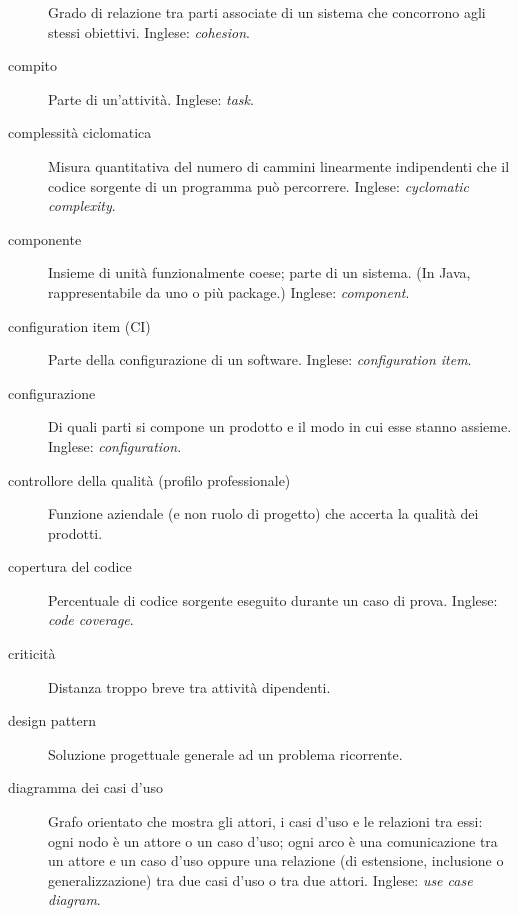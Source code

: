 \documentclass[a4paper]{article}
\begin{document}
\begin{description}
			Grado di relazione tra parti associate di un sistema che concorrono agli stessi obiettivi. Inglese: \emph{cohesion}.
			
	\item[compito] 

			Parte di un'attività. Inglese: \emph{task}.
			
	\item[complessità ciclomatica] 

			Misura quantitativa del numero di cammini linearmente indipendenti che il codice sorgente di un programma può percorrere. Inglese: \emph{cyclomatic complexity}.
			
	\item[componente] 

			Insieme di unità funzionalmente coese; parte di un sistema. (In Java, rappresentabile da uno o più package.) Inglese: \emph{component}.
			
	\item[configuration item (CI)] 

			Parte della configurazione di un software. Inglese: \emph{configuration item}.
			
	\item[configurazione] 

			Di quali parti si compone un prodotto e il modo in cui esse stanno assieme. Inglese: \emph{configuration}.
			
	\item[controllore della qualità (profilo professionale)] 

			Funzione aziendale (e non ruolo di progetto) che accerta la qualità dei prodotti.
			
	\item[copertura del codice] 

			Percentuale di codice sorgente eseguito durante un caso di prova. Inglese: \emph{code coverage}.
			
	\item[criticità] 

			Distanza troppo breve tra attività dipendenti.
			
	\item[design pattern] 

			Soluzione progettuale generale ad un problema ricorrente.
			
	\item[diagramma dei casi d'uso] 

			Grafo orientato che mostra gli attori, i casi d'uso e le relazioni tra essi: ogni nodo è un attore o un caso d'uso; ogni arco è una comunicazione tra un attore e un caso d'uso oppure una relazione (di estensione, inclusione o generalizzazione) tra due casi d'uso o tra due attori. Inglese: \emph{use case diagram}.
			

\end{description}
\end{document}
